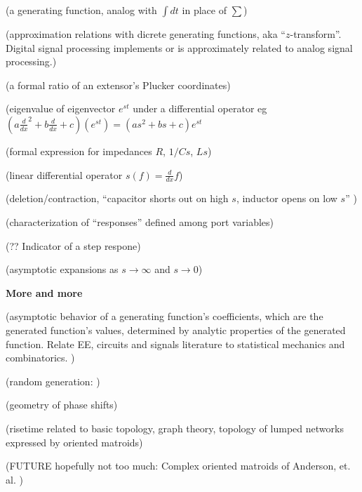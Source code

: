 \documentclass{article}
\begin{document}
(a generating function, analog with $\int dt$ in place of $\sum$)

(approximation relations with dicrete generating functions, 
aka ``$z$-transform''. Digital signal processing implements or
is approximately related to analog signal processing.)

(a formal ratio of an extensor's Plucker coordinates)

(eigenvalue of eigenvector $e^{s t}$ under a differential operator eg 
$(a\frac{d}{dx}^2 + b\frac{d}{dx} + c)(e^{st}) = (as^2 +bs + c)e^{st}$

(formal expression for impedances $R$, $1/Cs$, $Ls$)

(linear differential operator $s(f) = \frac{d}{dx}f$)

(deletion/contraction, 
``capacitor shorts out on high $s$, inductor opens on low $s$'' 
\cite{intuitAna})

(characterization of ``responses'' defined among port variables)

(?? Indicator of a step respone)

(asymptotic expansions as $s\rightarrow\infty$
and $s\rightarrow 0$)

\noindent\textbf{More and more}

(asymptotic behavior of a generating function's coefficients, which are
the generated function's values, determined by analytic properties of the
generated function.  Relate EE, circuits and signals literature to 
statistical mechanics and combinatorics.  
\cite{statMechForGraphers,multivarHalfPlane,AnalyticCombinatoricsBook})

(random generation: \cite{BoltzmanSampRandCombGen})

(geometry of phase shifts)

(risetime related to basic topology, graph theory, topology of lumped
networks expressed by oriented matroids)

(FUTURE hopefully not too much: Complex oriented matroids of Anderson, et.
al. \cite{complexOM})




{}

\end{document}

